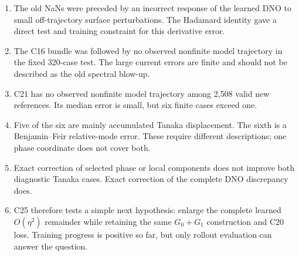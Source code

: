 \documentclass[11pt]{article}
\begin{document}
\begin{enumerate}[leftmargin=*,label=\textbf{\arabic*.}]
  \item The old NaNs were preceded by an incorrect response of the learned DNO
  to small off-trajectory surface perturbations.  The Hadamard identity gave a
  direct test and training constraint for this derivative error.

  \item The C16 bundle was followed by no observed nonfinite model trajectory
  in the fixed 320-case test.  The large current errors are finite and should
  not be described as the old spectral blow-up.

  \item C21 has no observed nonfinite model trajectory among 2,508 valid new
  references.  Its median error is small, but six finite cases exceed one.

  \item Five of the six are mainly accumulated Tanaka displacement.  The
  sixth is a Benjamin--Feir relative-mode error.  These require different
  descriptions; one phase coordinate does not cover both.

  \item Exact correction of selected phase or local components does not
  improve both diagnostic Tanaka cases.  Exact correction of the complete DNO
  discrepancy does.

  \item C25 therefore tests a simple next hypothesis: enlarge the complete
  learned $O(\eta^2)$ remainder while retaining the same $G_0+G_1$
  construction and C20 loss.  Training progress is positive so far, but only
  rollout evaluation can answer the question.
\end{enumerate}
\end{document}
